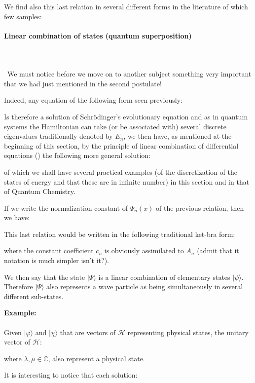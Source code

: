 	We find also this last relation in several different forms in the literature of which few samples:
	
	
	\paragraph{Linear combination of states (quantum superposition)}\label{quantum superposition}\mbox{}\\\\\
	We must notice before we move on to another subject something very important that we had just mentioned in the second postulate!

	Indeed, any equation of the following form seen previously:
	
	Is therefore a solution of Schrödinger's evolutionary equation and as in quantum systems the Hamiltonian can take (or be associated with) several discrete eigenvalues traditionally denoted by $E_n$, we then have, as mentioned at the beginning of this section, by the principle of linear combination of differential equations () the following more general solution:
	
	of which we shall have several practical examples (of the discretization of the states of energy and that these are in infinite number) in this section and in that of Quantum Chemistry.

	If we write the normalization constant of $\Psi_n(x)$ of the previous relation, then we have:
	
	This last relation would be written in the following traditional ket-bra form:
	
	where the constant coefficient $c_n$ is obviously assimilated to $A_n$ (admit that it notation is much simpler isn't it?).
	
	We then say that the state $|\Psi\rangle$ is a linear combination of elementary states $|\psi\rangle$. Therefore $|\Psi\rangle$ also represents a wave particle as being simultaneously in several different sub-states.
	\begin{tcolorbox}[colframe=black,colback=white,sharp corners]
	\textbf{{\Large {}}Example:}\\\\
	Given $|\varphi\rangle$ and $|\chi\rangle$ that are vectors of $\mathcal{H}$ representing physical states, the unitary vector of $\mathcal{H}$:
	
	where $\lambda,\mu\in\mathbb{C}$, also represent a physical state.
	\end{tcolorbox}
	It is interesting to notice that each solution:
	
